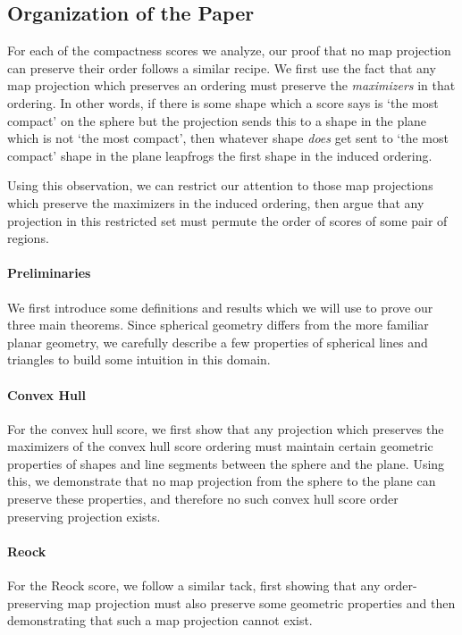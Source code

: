 \subsection{Organization of the Paper}


For each of the compactness scores we analyze, our proof that no map
projection can preserve their order follows a similar recipe. We
first use the fact that any map projection which preserves an ordering
must preserve the \textit{maximizers} in that ordering.  In other words,
if there is some shape which a score says is `the most compact' on the sphere 
but the projection sends this to a shape in the plane which is not `the most compact', then whatever 
shape \textit{does} get sent to `the most compact' shape in the plane leapfrogs 
the first shape in the induced ordering.

Using this observation, we can restrict our attention to those map
projections which preserve the maximizers in the induced ordering,
then argue that any projection in this restricted set must permute the
order of scores of some pair of regions.


\paragraph{Preliminaries}
We first introduce some definitions and results which we will use to prove our 
three main theorems.  Since spherical geometry differs from the more familiar planar geometry, 
we carefully describe a few properties of spherical lines and triangles to build some intuition 
in this domain. 


\paragraph{Convex Hull}
For the convex hull score, we first 
show that any projection which preserves the maximizers of the convex hull score 
ordering must maintain certain geometric properties of shapes and line segments 
between the sphere and the plane.  Using this, we demonstrate that no 
map projection from the sphere to the plane can preserve these properties, and therefore 
no such convex hull score order preserving projection exists.



\paragraph{Reock}
For the Reock score, we follow a similar tack, first showing that any 
order-preserving map projection must also preserve some geometric properties 
and then demonstrating that such a map projection cannot exist.





